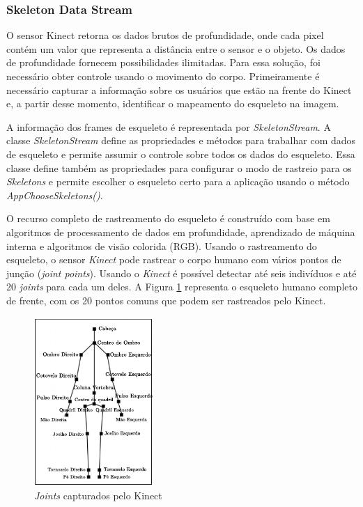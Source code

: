 \subsubsection{Skeleton Data Stream}\label{sec:skeletonStream}
O sensor Kinect retorna os dados brutos de profundidade, onde cada pixel contém um valor que representa a distância entre o sensor e o objeto. Os dados de profundidade fornecem possibilidades ilimitadas. Para essa solução, foi necessário obter controle usando o movimento do corpo. Primeiramente é necessário capturar a informação sobre os usuários que estão na frente do Kinect e, a partir desse momento, identificar o mapeamento do esqueleto na imagem.

A informação dos frames de esqueleto é representada por \textit{SkeletonStream}. A classe \textit{SkeletonStream} define as propriedades e métodos para trabalhar com dados de esqueleto e permite assumir o controle sobre todos os dados do esqueleto. Essa classe define também as propriedades para configurar o modo de rastreio para os \textit{Skeletons} e permite escolher o esqueleto certo para a aplicação usando o método \textit{AppChooseSkeletons()}. 

O recurso completo de rastreamento do esqueleto é construído com base em algoritmos de processamento de dados em profundidade, aprendizado de máquina interna e algoritmos de visão colorida (RGB). Usando o rastreamento do esqueleto, o sensor \textit{Kinect} pode rastrear o corpo humano com vários pontos de junção (\textit{joint points}). Usando o \textit{Kinect} é possível detectar até seis indivíduos e até 20 \textit{joints} para cada um deles. A Figura \ref{fig:human_joints} representa o esqueleto humano completo de frente, com os 20 pontos comuns que podem ser rastreados pelo Kinect.

\begin{figure}[ht]
\centering
\includegraphics[width=0.4\textwidth]{images/human_joints.png}
\caption{\textit{Joints} capturados pelo Kinect}
\label{fig:human_joints}
\end{figure}

